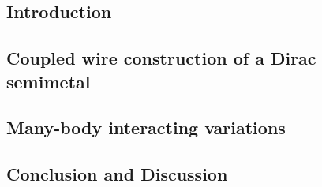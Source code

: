 




%


\subsection{Introduction}\label{sec:introduction}


\subsection{Coupled wire construction of a Dirac semimetal}\label{sec:DiracSemimetal}


\subsection{Many-body interacting variations}\label{sec:interaction}


\subsection{Conclusion and Discussion}

